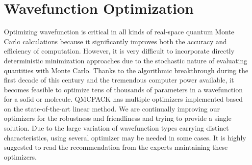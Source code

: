 \section{Wavefunction Optimization}
Optimizing wavefunction is critical in all kinds of real-space quantum Monte Carlo calculations
because it significantly improves both the accuracy and efficiency of computation.
However, it is very difficult to incorporate directly deterministic minimization approaches due to the stochastic nature of evaluating quantities with Monte Carlo.
Thanks to the algorithmic breakthrough during the first decade of this century and the tremendous computer power available, 
it becomes feasible to optimize tens of thousands of parameters in a wavefunction for a solid or molecule.
QMCPACK has multiple optimizers implemented based on the state-of-the-art linear method.
We are continually improving our optimizers for the robustness and friendliness and trying to provide a single solution.
Due to the large variation of wavefunction types carrying distinct characteristics, using several optimizer may be needed in some cases.
It is highly suggested to read the recommendation from the experts maintaining these optimizers.

